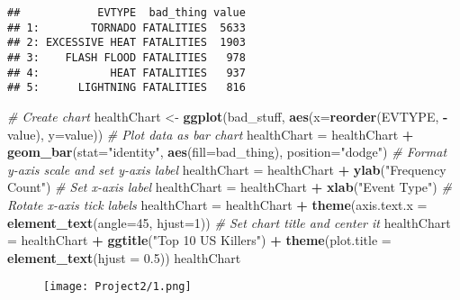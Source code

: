\documentclass[]{article}
\newenvironment{Shaded}{\begin{snugshade}}{\end{snugshade}}
\newcommand{\KeywordTok}[1]{\textcolor[rgb]{0.13,0.29,0.53}{\textbf{#1}}}
\newcommand{\DataTypeTok}[1]{\textcolor[rgb]{0.13,0.29,0.53}{#1}}
\newcommand{\DecValTok}[1]{\textcolor[rgb]{0.00,0.00,0.81}{#1}}
\newcommand{\FloatTok}[1]{\textcolor[rgb]{0.00,0.00,0.81}{#1}}
\newcommand{\StringTok}[1]{\textcolor[rgb]{0.31,0.60,0.02}{#1}}
\newcommand{\CommentTok}[1]{\textcolor[rgb]{0.56,0.35,0.01}{\textit{#1}}}
\newcommand{\OperatorTok}[1]{\textcolor[rgb]{0.81,0.36,0.00}{\textbf{#1}}}
\newcommand{\NormalTok}[1]{#1}
\begin{document}
\begin{verbatim}
##            EVTYPE  bad_thing value
## 1:        TORNADO FATALITIES  5633
## 2: EXCESSIVE HEAT FATALITIES  1903
## 3:    FLASH FLOOD FATALITIES   978
## 4:           HEAT FATALITIES   937
## 5:      LIGHTNING FATALITIES   816
\end{verbatim}

\begin{Shaded}
\begin{Highlighting}[]
\CommentTok{# Create chart}
\NormalTok{healthChart <-}\StringTok{ }\KeywordTok{ggplot}\NormalTok{(bad_stuff, }\KeywordTok{aes}\NormalTok{(}\DataTypeTok{x=}\KeywordTok{reorder}\NormalTok{(EVTYPE, }\OperatorTok{-}\NormalTok{value), }\DataTypeTok{y=}\NormalTok{value))}
\CommentTok{# Plot data as bar chart}
\NormalTok{healthChart =}\StringTok{ }\NormalTok{healthChart }\OperatorTok{+}\StringTok{ }\KeywordTok{geom_bar}\NormalTok{(}\DataTypeTok{stat=}\StringTok{"identity"}\NormalTok{, }\KeywordTok{aes}\NormalTok{(}\DataTypeTok{fill=}\NormalTok{bad_thing), }\DataTypeTok{position=}\StringTok{"dodge"}\NormalTok{)}
\CommentTok{# Format y-axis scale and set y-axis label}
\NormalTok{healthChart =}\StringTok{ }\NormalTok{healthChart }\OperatorTok{+}\StringTok{ }\KeywordTok{ylab}\NormalTok{(}\StringTok{"Frequency Count"}\NormalTok{) }
\CommentTok{# Set x-axis label}
\NormalTok{healthChart =}\StringTok{ }\NormalTok{healthChart }\OperatorTok{+}\StringTok{ }\KeywordTok{xlab}\NormalTok{(}\StringTok{"Event Type"}\NormalTok{) }
\CommentTok{# Rotate x-axis tick labels }
\NormalTok{healthChart =}\StringTok{ }\NormalTok{healthChart }\OperatorTok{+}\StringTok{ }\KeywordTok{theme}\NormalTok{(}\DataTypeTok{axis.text.x =} \KeywordTok{element_text}\NormalTok{(}\DataTypeTok{angle=}\DecValTok{45}\NormalTok{, }\DataTypeTok{hjust=}\DecValTok{1}\NormalTok{))}
\CommentTok{# Set chart title and center it}
\NormalTok{healthChart =}\StringTok{ }\NormalTok{healthChart }\OperatorTok{+}\StringTok{ }\KeywordTok{ggtitle}\NormalTok{(}\StringTok{"Top 10 US Killers"}\NormalTok{) }\OperatorTok{+}\StringTok{ }\KeywordTok{theme}\NormalTok{(}\DataTypeTok{plot.title =} \KeywordTok{element_text}\NormalTok{(}\DataTypeTok{hjust =} \FloatTok{0.5}\NormalTok{))}
\NormalTok{healthChart}
\end{Highlighting}
\end{Shaded}

\begin{figure}
\centering
\texttt{[image: Project2/1.png]}
\caption{}
\end{figure}
\end{document}

